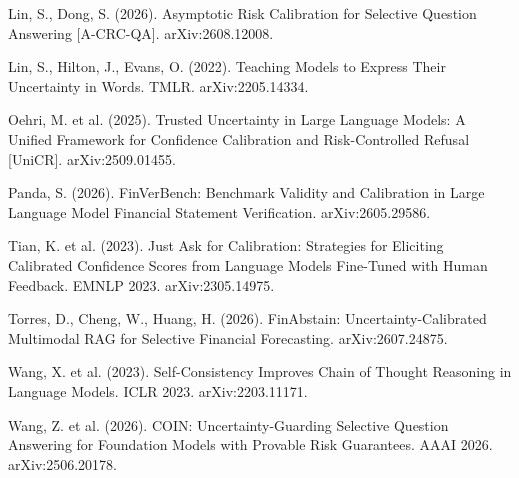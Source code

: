 \documentclass[11pt]{article}
\begin{document}
\begin{list}{}{\setlength{\leftmargin}{1.5em}\setlength{\itemindent}{-1.5em}\setlength{\itemsep}{2pt}}
\item Lin, S., Dong, S. (2026). Asymptotic Risk Calibration for Selective Question Answering [A-CRC-QA]. arXiv:2608.12008.
\item Lin, S., Hilton, J., Evans, O. (2022). Teaching Models to Express Their Uncertainty in Words. TMLR. arXiv:2205.14334.
\item Oehri, M. et al. (2025). Trusted Uncertainty in Large Language Models: A Unified Framework for Confidence Calibration and Risk-Controlled Refusal [UniCR]. arXiv:2509.01455.
\item Panda, S. (2026). FinVerBench: Benchmark Validity and Calibration in Large Language Model Financial Statement Verification. arXiv:2605.29586.
\item Tian, K. et al. (2023). Just Ask for Calibration: Strategies for Eliciting Calibrated Confidence Scores from Language Models Fine-Tuned with Human Feedback. EMNLP 2023. arXiv:2305.14975.
\item Torres, D., Cheng, W., Huang, H. (2026). FinAbstain: Uncertainty-Calibrated Multimodal RAG for Selective Financial Forecasting. arXiv:2607.24875.
\item Wang, X. et al. (2023). Self-Consistency Improves Chain of Thought Reasoning in Language Models. ICLR 2023. arXiv:2203.11171.
\item Wang, Z. et al. (2026). COIN: Uncertainty-Guarding Selective Question Answering for Foundation Models with Provable Risk Guarantees. AAAI 2026. arXiv:2506.20178.
\end{list}
\end{document}
